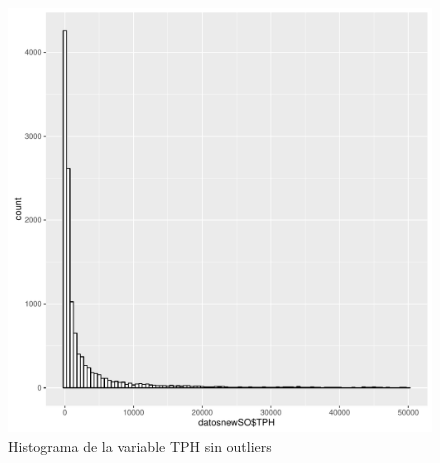 \documentclass[conference]{IEEEtran}\usepackage[]{graphicx}\usepackage[]{color}
\makeatletter
\def\maxwidth{ %
  \ifdim\Gin@nat@width>\linewidth
    \linewidth
  \else
    \Gin@nat@width
  \fi
}
\newenvironment{knitrout}{}{} %
\makeatother
\begin{document}
\begin{figure}[H]
	\centering
\begin{knitrout}
\color{fgcolor}
\includegraphics[width=\maxwidth]{figure/sinatipicos-1} 

\end{knitrout}
	\caption{Histograma de la variable TPH sin outliers}
\end{figure}
\end{document}
